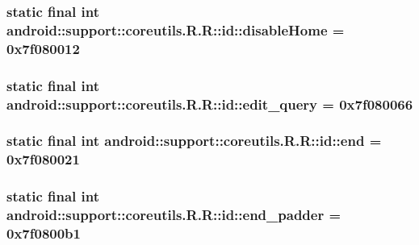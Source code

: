 \hypertarget{classandroid_1_1support_1_1coreutils_1_1_r_1_1id_91c10cc398a0753f507dee5f5a61379f}{
\subsubsection[{disableHome}]{\setlength{\rightskip}{0pt plus 5cm}static final int android::support::coreutils.R.R::id::disableHome = 0x7f080012}}
\label{classandroid_1_1support_1_1coreutils_1_1_r_1_1id_91c10cc398a0753f507dee5f5a61379f}


\hypertarget{classandroid_1_1support_1_1coreutils_1_1_r_1_1id_df47559374b08abb504635fbfcb98a5f}{
\subsubsection[{edit\_\-query}]{\setlength{\rightskip}{0pt plus 5cm}static final int android::support::coreutils.R.R::id::edit\_\-query = 0x7f080066}}
\label{classandroid_1_1support_1_1coreutils_1_1_r_1_1id_df47559374b08abb504635fbfcb98a5f}


\hypertarget{classandroid_1_1support_1_1coreutils_1_1_r_1_1id_b39c4653cb0c1553642e8cdaecf46bd1}{
\subsubsection[{end}]{\setlength{\rightskip}{0pt plus 5cm}static final int android::support::coreutils.R.R::id::end = 0x7f080021}}
\label{classandroid_1_1support_1_1coreutils_1_1_r_1_1id_b39c4653cb0c1553642e8cdaecf46bd1}


\hypertarget{classandroid_1_1support_1_1coreutils_1_1_r_1_1id_08f7b43bdd3c670cc29784ea3cc6d630}{
\subsubsection[{end\_\-padder}]{\setlength{\rightskip}{0pt plus 5cm}static final int android::support::coreutils.R.R::id::end\_\-padder = 0x7f0800b1}}
\label{classandroid_1_1support_1_1coreutils_1_1_r_1_1id_08f7b43bdd3c670cc29784ea3cc6d630}


